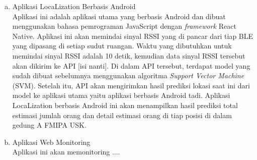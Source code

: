 \begin{enumerate}[a.]







	\item Aplikasi LocaLization Berbasis Android
	      \\
	      Aplikasi ini adalah aplikasi utama yang berbasis Android dan dibuat menggunakan bahasa pemrograman JavaScript dengan \textit{framework} React Native. Aplikasi ini akan memindai sinyal RSSI yang di pancar dari tiap BLE yang dipasang di setiap sudut ruangan. Waktu yang dibutuhkan untuk memindai sinyal RSSI adalah 10 detik, kemudian data sinyal RSSI tersebut akan dikirim ke API [isi nanti]. Di dalam API tersebut, terdapat model yang sudah dibuat sebelumnya menggunakan algoritma \textit{Support Vector Machine} (SVM). Setelah itu, API akan mengirimkan hasil prediksi lokasi saat ini dari model ke aplikasi utama yaitu aplikasi berbasis Android tadi. Aplikasi LocaLization berbasis Android ini akan menampilkan hasil prediksi total estimasi jumlah orang dan detail estimasi orang di tiap posisi di dalam gedung A FMIPA USK.

	\item Aplikasi Web Monitoring
	      \\ Aplikasi ini akan memonitoring ....

\end{enumerate}

